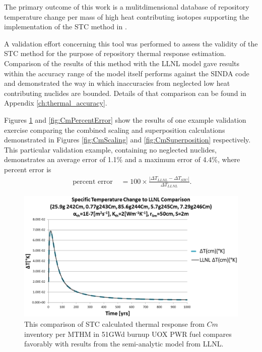 
The primary outcome of this work is a mulitdimensional database of repository temperature 
change per mass of high heat contributing isotopes supporting the implementation 
of the \gls{STC} method in \Cyder. 

A validation effort concerning this tool was performed to assess the validity 
of the \gls{STC} method for the purpose of repository thermal response 
estimation.  Comparison of the results of this method with the \gls{LLNL} model 
\cite{greenberg_application_2012} gave results within the accuracy range of the 
model itself performs against the SINDA code \cite{huff_numerical_2012} and 
demonstrated the way in which inaccuracies from neglected low heat contributing 
nuclides are bounded. Details of that comparison can be found in Appendix 
\ref{ch:thermal_accuracy}. 

Figures \ref{fig:CmValidation} and \ref{fig:CmPercentError} show the results of 
one example validation exercise comparing the combined scaling and  
superposition calculations demonstrated in Figures \ref{fig:CmScaling} and 
\ref{fig:CmSuperposition} respectively. This particular validation example, 
containing no neglected nuclides, demonstrates an average error of 1.1\% and a 
maximum error of 4.4\%, where percent error is 
\begin{align}
\mbox{ percent error } &= 100\times\frac{\left|\Delta T_{LLNL} - \Delta T_{STC}\right|}{ \Delta T_{LLNL}}.
\end{align}

\begin{figure}[htp!]
\begin{center}
\includegraphics[width=\columnwidth]{./chapters/methodology/thermal_models/CmValidation.eps}
\end{center}
\caption[STC method validation against LLNL model]{This comparison of \gls{STC} calculated thermal response from $Cm$ 
inventory per MTHM in 51GWd burnup UOX PWR fuel compares favorably with results 
from the semi-analytic model from LLNL.} 
\label{fig:CmValidation}
\end{figure}

